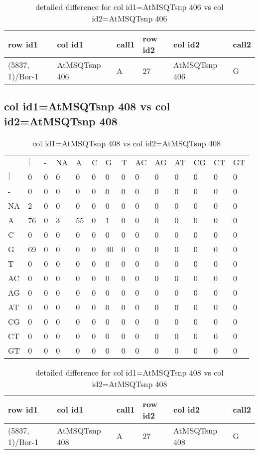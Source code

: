 \begin{center}
\begin{longtable}{|l|l|l|l|l|l|}
\caption{detailed difference for col id1=AtMSQTsnp 406 vs col id2=AtMSQTsnp 406} \label{table_dm729}\\
\hline
row id1&col id1&call1&row id2&col id2&call2\\
\hline
(5837, 1)/Bor-1&AtMSQTsnp 406&A&27&AtMSQTsnp 406&G\\
\hline
\end{longtable}
\end{center}

\subsection{col id1=AtMSQTsnp 408 vs col id2=AtMSQTsnp 408}
\begin{center}
\begin{longtable}{|l|l|l|l|l|l|l|l|l|l|l|l|l|l|}
\caption{col id1=AtMSQTsnp 408 vs col id2=AtMSQTsnp 408} \label{table_dm730}\\
\hline
\\
\hline
&$|$&-&NA&A&C&G&T&AC&AG&AT&CG&CT&GT\\
$|$&0&0&0&0&0&0&0&0&0&0&0&0&0\\
-&0&0&0&0&0&0&0&0&0&0&0&0&0\\
NA&2&0&0&0&0&0&0&0&0&0&0&0&0\\
A&76&0&3&55&0&1&0&0&0&0&0&0&0\\
C&0&0&0&0&0&0&0&0&0&0&0&0&0\\
G&69&0&0&0&0&40&0&0&0&0&0&0&0\\
T&0&0&0&0&0&0&0&0&0&0&0&0&0\\
AC&0&0&0&0&0&0&0&0&0&0&0&0&0\\
AG&0&0&0&0&0&0&0&0&0&0&0&0&0\\
AT&0&0&0&0&0&0&0&0&0&0&0&0&0\\
CG&0&0&0&0&0&0&0&0&0&0&0&0&0\\
CT&0&0&0&0&0&0&0&0&0&0&0&0&0\\
GT&0&0&0&0&0&0&0&0&0&0&0&0&0\\
\hline
\end{longtable}
\end{center}

\begin{center}
\begin{longtable}{|l|l|l|l|l|l|}
\caption{detailed difference for col id1=AtMSQTsnp 408 vs col id2=AtMSQTsnp 408} \label{table_dm731}\\
\hline
row id1&col id1&call1&row id2&col id2&call2\\
\hline
(5837, 1)/Bor-1&AtMSQTsnp 408&A&27&AtMSQTsnp 408&G\\
\hline
\end{longtable}
\end{center}

